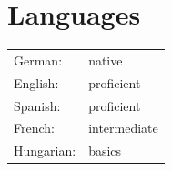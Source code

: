 \documentclass[11pt]{article}
\begin{document}
	\section*{Languages}
	\begin{tabularx}{\textwidth}{sX}
		German: & native \\
		English: & proficient \\
		Spanish: & proficient \\
		French: & intermediate \\
		Hungarian: & basics 
	\end{tabularx}
	

	
\end{document}
